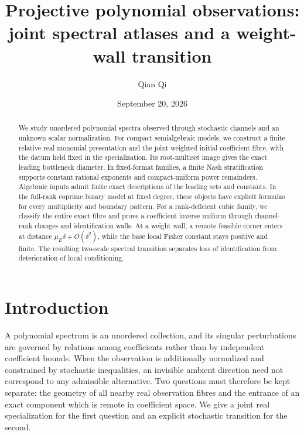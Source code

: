 
\title[Joint spectral atlases and a weight wall]{Projective polynomial observations:\\ joint spectral atlases and a weight-wall transition}
\author{Qian Qi}
\date{September 20, 2026}

\begin{abstract}
We study unordered polynomial spectra observed through stochastic channels
and an unknown scalar normalization. For compact semialgebraic models,
we construct a finite relative real monomial presentation and the joint
weighted initial coefficient fibre, with the datum held fixed in the
specialization. Its root-multiset image gives the exact leading bottleneck
diameter. In fixed-format families, a finite Nash stratification supports
constant rational exponents and compact-uniform power remainders.
Algebraic inputs admit finite exact descriptions of the leading sets and
constants. In the full-rank coprime binary model at fixed degree, these
objects have explicit formulas for every multiplicity and boundary pattern.
For a rank-deficient cubic family, we classify the entire exact fibre and
prove a coefficient inverse uniform through channel-rank changes and
identification walls. At a weight wall, a remote feasible corner enters
at distance $\mu_E\delta+O(\delta^2)$, while the base local Fisher constant
stays positive and finite. The resulting two-scale spectral transition
separates loss of identification from deterioration of local conditioning.
\end{abstract}
\maketitle

\section{Introduction}
A polynomial spectrum is an unordered collection, and its singular
perturbations are governed by relations among coefficients rather than by
independent coefficient bounds. When the observation is additionally
normalized and constrained by stochastic inequalities, an invisible
ambient direction need not correspond to any admissible alternative.
Two questions must therefore be kept separate: the geometry of all
nearby real observation fibres and the entrance of an exact component
which is remote in coefficient space. We give a joint real specialization
for the first question and an explicit stochastic transition for the second.

